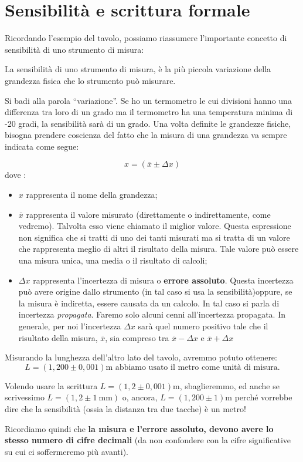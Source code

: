 \section{Sensibilità e scrittura formale}

Ricordando l'esempio del tavolo, possiamo riassumere l'importante concetto di sensibilità di uno strumento di misura:

\begin{sen}
	La sensibilità di uno strumento di misura, è la più piccola variazione della grandezza fisica che lo strumento può misurare.
\end{sen}

Si badi alla parola ``variazione''. Se ho un termometro le cui divisioni hanno una differenza tra loro di un grado ma il termometro ha una temperatura minima di -20 gradi, la sensibilità sarà di un grado.
Una volta definite le grandezze fisiche, bisogna prendere coscienza del fatto che la misura di una grandezza va sempre indicata come segue:

\[
x=\left( \overline{x} \pm \Delta x\right)
\]
dove :
\begin{itemize}
\item $x$ rappresenta il nome della grandezza;
\item $\overline{x}$ rappresenta il valore misurato (direttamente o indirettamente, come vedremo). Talvolta esso viene chiamato il miglior valore. Questa espressione non significa che si tratti di uno dei tanti misurati ma si tratta di un valore che rappresenta meglio di altri il risultato della misura. Tale valore può essere una misura unica, una media o il risultato di calcoli;
\item $\Delta x$ rappresenta l'incertezza di misura o \textbf{errore assoluto}. Questa incertezza può avere origine dallo strumento (in tal caso si usa la sensibilità)oppure, se la misura è indiretta, essere causata da un calcolo. In tal caso si parla di incertezza \textit{propagata}. Faremo solo alcuni cenni all'incertezza propagata. In generale, per noi l'incertezza $\Delta x$ sarà quel numero positivo tale che il risultato della misura, $\overline{x}$, sia compreso tra $\overline{x} -\Delta x$ e  $\overline{x} +\Delta x$
\end{itemize}

Misurando la lunghezza dell'altro lato del tavolo, avremmo potuto ottenere:
\[
L=\left(1,200 \pm 0,001\right)\si{\meter}  \,\, \text{abbiamo usato il metro come unità di misura.}
\]

Volendo usare la scrittura $L=\left(1,2 \pm 0,001\right)\si{\meter}$, sbaglieremmo, ed anche se scrivessimo $L=\left(1,2 \pm \SI{1}{\milli\meter}\right)$ o, ancora, $L=\left(1,200 \pm 1\right)\si{\meter}$ perché vorrebbe dire che la sensibilità (ossia la distanza tra due tacche) è un metro!

Ricordiamo quindi che \textbf{la misura e l'errore assoluto, devono avere lo stesso numero di cifre decimali} (da non confondere con la cifre significative su cui ci soffermeremo più avanti).
